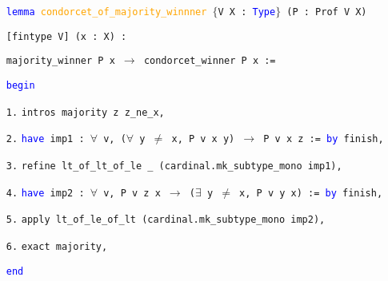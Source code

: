 \documentclass[runningheads]{llncs}
\begin{document}
\begin{itemize}
\item[] \texttt{\textcolor{blue}{lemma} \textcolor{orange}{condorcet\_of\_majority\_winnner} $\{$V X : \textcolor{blue}{Type}$\}$ (P : Prof V X)}

\texttt{[fintype V] (x : X) :}

\texttt{majority\_winner P x $\to$ condorcet\_winner P x :=}

\textcolor{blue}{\texttt{begin}}

\item[\texttt{1.}]\quad  \texttt{intros majority z z\_ne\_x,}
 
 

\item[\texttt{2.}]\quad  \texttt{\textcolor{blue}{have} imp1 : $\forall$ v, ($\forall$ y $\neq$ x, P v x y) $\to$ P v x z := \textcolor{blue}{by} finish,}


  
\item[\texttt{3.}]\quad  \texttt{refine lt\_of\_lt\_of\_le \_ (cardinal.mk\_subtype\_mono imp1),}
 
\item[\texttt{4.}]\quad  \texttt{\textcolor{blue}{have} imp2 : $\forall$ v, P v z x $\to$ ($\exists$ y $\neq$ x, P v y x) := \textcolor{blue}{by} finish,}
 
  
  
  
 \item[\texttt{5.}]\quad  \texttt{apply lt\_of\_le\_of\_lt (cardinal.mk\_subtype\_mono imp2),}
  
\item[\texttt{6.}]\quad  \texttt{exact majority, }
  
\textcolor{blue}{\texttt{end}}
\end{itemize}
\end{document}
